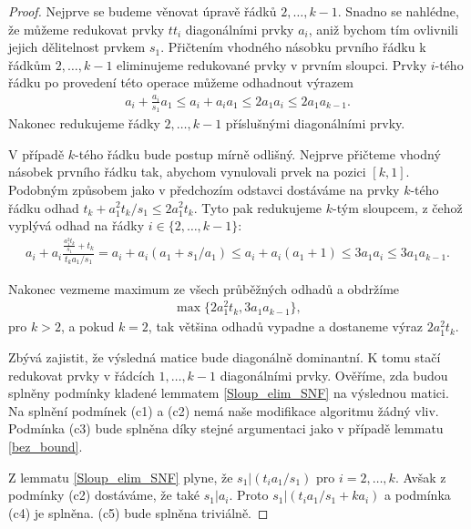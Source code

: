 \begin{proof}
Nejprve se budeme věnovat úpravě řádků $ 2, \dots, k - 1 $. 
Snadno se nahlédne, že můžeme redukovat prvky
$ t t_i $ diagonálními prvky $ a_i $, aniž bychom tím ovlivnili jejich dělitelnost
prvkem $ s_1 $. Přičtením vhodného násobku prvního řádku k řádkům 
$ 2, \dots, k - 1 $ eliminujeme redukované prvky v prvním sloupci. 
Prvky $ i $-tého řádku po provedení této operace můžeme odhadnout
výrazem 
\begin{align*}
    a_i + \frac{a_i}{s_1} a_1
    \leq a_i + a_i a_1
    \leq 2 a_1 a_i
    \leq 2 a_1 a_{k - 1}.
\end{align*}
Nakonec redukujeme řádky $ 2, \dots, k - 1 $ příslušnými diagonálními prvky.

V případě $ k $-tého řádku bude postup mírně odlišný. Nejprve přičteme vhodný 
násobek prvního řádku tak, abychom vynulovali prvek na pozici $ [k, 1] $. 
Podobným způsobem jako v předchozím odstavci dostáváme na prvky $ k $-tého řádku
odhad $ t_k + a_1^2 t_k / s_1 \leq 2 a_1^2 t_k $. Tyto pak redukujeme $ k $-tým 
sloupcem, z čehož vyplývá odhad na řádky $ i \in \{ 2, \dots, k - 1 \} $:
\begin{align*}
    a_i + a_i \frac{\frac{a_1^2 t_k}{s_1} + t_k}{t_k a_1 / s_1} 
        = a_i + a_i (a_1 + s_1 / a_1)
        \leq a_i + a_i (a_1 + 1) 
        \leq 3 a_1 a_i
        \leq 3 a_1 a_{k - 1}.
\end{align*}

Nakonec vezmeme maximum ze všech průběžných odhadů a obdržíme
\begin{align*}
    \max\{ 2 a_1^2 t_k, 3 a_1 a_{k - 1} \},
\end{align*}
pro $ k > 2 $, a pokud $ k = 2 $, tak většina odhadů vypadne a dostaneme výraz
$ 2 a_1^2 t_k $.

Zbývá zajistit, že výsledná matice bude diagonálně dominantní. K tomu stačí 
redukovat prvky v řádcích $ 1, \dots, k - 1 $ diagonálními prvky. Ověříme, zda 
budou splněny podmínky kladené lemmatem \ref{Sloup_elim_SNF} na výslednou matici.
Na splnění podmínek (c1) a (c2) nemá naše modifikace algoritmu žádný vliv.
Podmínka (c3) bude splněna díky stejné argumentaci jako v případě lemmatu
\ref{bez_bound}.

Z lemmatu \ref{Sloup_elim_SNF} plyne, že $ s_1 \vert (t_i a_1/s_1) $ pro
$ i = 2, \dots, k $. Avšak z podmínky (c2) dostáváme, že také $ s_1 \vert a_i $.
Proto $ s_1 \vert (t_i a_1/s_1 + k a_i) $ a podmínka (c4) je splněna. (c5) bude 
splněna triviálně.

\end{proof}

